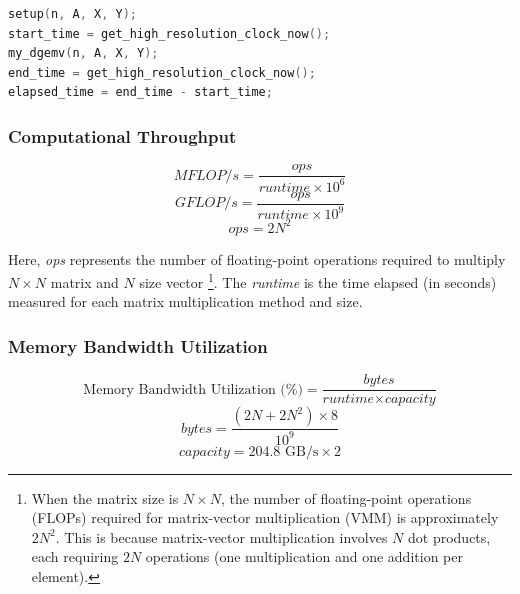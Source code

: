 \begin{lstlisting}[caption={Instrumentation code for measuring the elapsed time of matrix-vector multiplication},label={listing:measuring-elapsed-time},name=measuring-elapsed-time,float=htbp,style=mystyle,language=C++]
setup(n, A, X, Y);
start_time = get_high_resolution_clock_now();
my_dgemv(n, A, X, Y);
end_time = get_high_resolution_clock_now();
elapsed_time = end_time - start_time;
\end{lstlisting}

\subsubsection{Computational Throughput}
\label{subsubsec:mflops}

\begin{displaymath}
    MFLOP/s = \frac{\textit{ops}}{\textit{runtime} \times 10^6}
\end{displaymath}
\begin{displaymath}
    GFLOP/s = \frac{\textit{ops}}{\textit{runtime} \times 10^9} 
\end{displaymath}
\begin{displaymath}
    \textit{ops} = 2N^2
\end{displaymath}

Here, \textit{ops} represents the number of floating-point operations required to multiply \(N \times N\) matrix and \(N\) size vector \footnote{When the matrix size is \(N \times N\), the number of floating-point operations (FLOPs) required for matrix-vector multiplication (VMM) is approximately \(2N^2\). This is because matrix-vector multiplication involves \(N\) dot products, each requiring \(2N\) operations (one multiplication and one addition per element).}. The \textit{runtime} is the time elapsed (in seconds) measured for each matrix multiplication method and size.


\subsubsection{Memory Bandwidth Utilization}
\label{subsubsec:memory-bandwidth-utilization}

\begin{displaymath}
    \text{Memory Bandwidth Utilization (\%)} = \frac{\textit{bytes}}{\textit{runtime} \times \textit{capacity}}
\end{displaymath}
\begin{displaymath}
    \textit{bytes} = \frac{(2N + 2N^2) \times 8}{10^9}
\end{displaymath}
\begin{displaymath}
    \textit{capacity} = 204.8 \text{ GB/s} \times 2
\end{displaymath}

